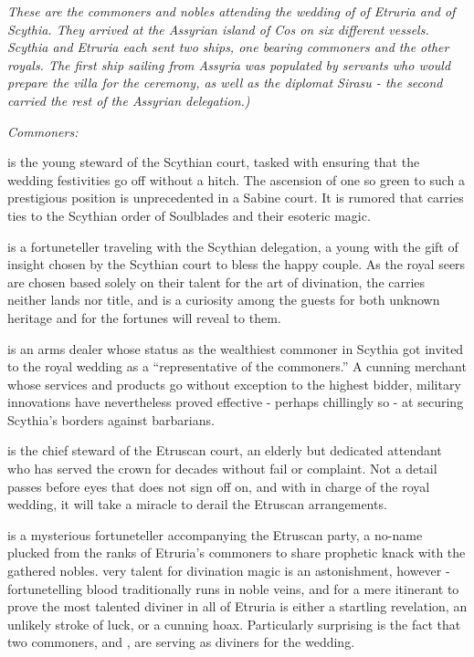 \documentclass[blue]{Kos}
\begin{document}
\name{\bWhosWho{}}

\emph{These are the commoners and nobles attending the wedding of \cGroom{\Prince} \cGroom{} of Etruria and \cBride{\Prince} \cBride{} of Scythia. They arrived at the Assyrian island of Cos on six different vessels. Scythia and Etruria each sent two ships, one bearing commoners and the other royals. The first ship sailing from Assyria was populated by servants who would prepare the villa for the ceremony, as well as the diplomat Sirasu - the second carried the rest of the Assyrian delegation.)}

\emph{Commoners:}

\cButler{} is the young steward of the Scythian court, tasked with ensuring that the wedding festivities go off without a hitch. The ascension of one so green to such a prestigious position is unprecedented in a Sabine court. It is rumored that \cButler{\they} carries ties to the Scythian order of Soulblades and their esoteric magic.

\cBurglar{} is a fortuneteller traveling with the Scythian delegation, a young \cBurglar{\human} with the gift of insight chosen by the Scythian court to bless the happy couple. As the royal seers are chosen based solely on their talent for the art of divination, the \cBurglar{\human} carries neither lands nor title, and \cBurglar{\they} is a curiosity among the guests for both \cBurglar{\their} unknown heritage and for the fortunes \cBurglar{\they} will reveal to them.

\cArmsDealer{} is an arms dealer whose status as the wealthiest commoner in Scythia got \cArmsDealer{\them} invited to the royal wedding as a ``representative of the commoners.'' A cunning merchant whose services and products go without exception to the highest bidder, \cArmsDealer{\their} military innovations have nevertheless proved effective - perhaps chillingly so - at securing Scythia's borders against barbarians.

\cAssassin{} is the chief steward of the Etruscan court, an elderly but dedicated attendant who has served the crown for decades without fail or complaint. Not a detail passes before \cAssassin{\their} eyes that \cAssassin{\they} does not sign off on, and with \cAssassin{\them} in charge of the royal wedding, it will take a miracle to derail the Etruscan arrangements.

\cFugitive{} is a mysterious fortuneteller accompanying the Etruscan party, a no-name plucked from the ranks of Etruria's commoners to share \cFugitive{\their} prophetic knack with the gathered nobles. \cFugitive{\Their} very talent for divination magic is an astonishment, however - fortunetelling blood traditionally runs in noble veins, and for a mere itinerant to prove the most talented diviner in all of Etruria is either a startling revelation, an unlikely stroke of luck, or a cunning hoax. Particularly surprising is the fact that two commoners, \cFugitive{} and \cBurglar{}, are serving as diviners for the wedding.
\end{document}
